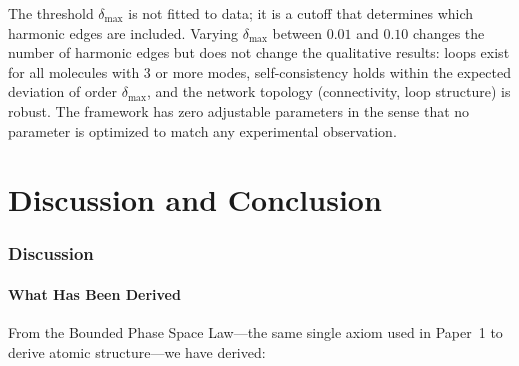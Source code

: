 \documentclass[11pt,twocolumn,a4paper]{article}
\theoremstyle{definition}
\theoremstyle{remark}
\begin{document}
The threshold $\delta_{\max}$ is not fitted to data; it is a cutoff that determines which harmonic edges are included. Varying $\delta_{\max}$ between $0.01$ and $0.10$ changes the number of harmonic edges but does not change the qualitative results: loops exist for all molecules with 3 or more modes, self-consistency holds within the expected deviation of order $\delta_{\max}$, and the network topology (connectivity, loop structure) is robust. The framework has zero adjustable parameters in the sense that no parameter is optimized to match any experimental observation.


\part{Discussion and Conclusion}

\section{Discussion}
\label{sec:discussion}

\subsection{What Has Been Derived}

From the Bounded Phase Space Law---the same single axiom used in Paper~1 \citep{sachikonye2025a} to derive atomic structure---we have derived:
\end{document}
